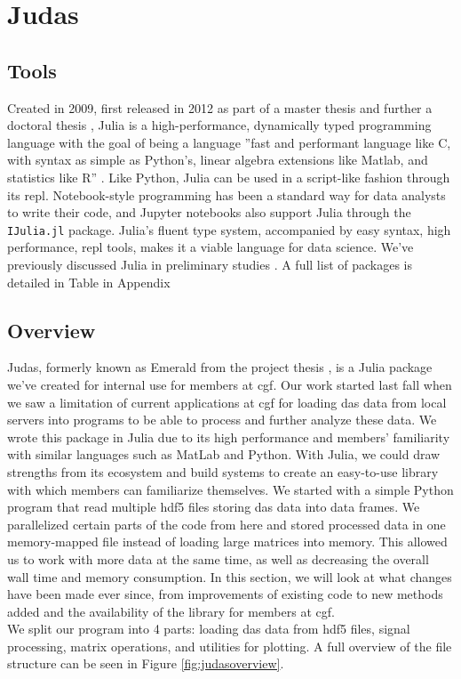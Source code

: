 \section{Judas}
\label{met:Judas}

\subsection{Tools}
\label{met:Julia}

Created in 2009, first released in 2012 as part of a master thesis \cite{juliaMs} and further a doctoral thesis \cite{juliaPHD}, Julia is a high-performance, dynamically typed programming language with the goal of being a language ''fast and performant language like C, with syntax as simple as Python's, linear algebra extensions like Matlab, and statistics like R'' \cite{julia}. Like Python, Julia can be used in a script-like fashion through its \acrfull{repl}. Notebook-style programming has been a standard way for data analysts to write their code, and Jupyter notebooks also support Julia through the \texttt{IJulia.jl} package. Julia's fluent type system, accompanied by easy syntax, high performance, \acrshort{repl} tools, makes it a viable language for data science. We've previously discussed Julia in preliminary studies \cite{projthesis}. A full list of packages is detailed in Table in Appendix 

\subsection{Overview}
\label{met:judasoverview}

Judas, formerly known as Emerald from the project thesis \cite{projthesis}, is a Julia package we've created for internal use for members at \acrshort{cgf}. Our work started last fall when we saw a limitation of current applications at \acrshort{cgf} for loading \acrshort{das} data from local servers into programs to be able to process and further analyze these data. We wrote this package in Julia due to its high performance and members' familiarity with similar languages such as MatLab and Python. With Julia, we could draw strengths from its ecosystem and build systems to create an easy-to-use library with which members can familiarize themselves. We started with a simple Python program that read multiple \acrshort{hdf5} files storing \acrshort{das} data into data frames. We parallelized certain parts of the code from here and stored processed data in one memory-mapped file instead of loading large matrices into memory. This allowed us to work with more data at the same time, as well as decreasing the overall wall time and memory consumption.  
In this section, we will look at what changes have been made ever since, from improvements of existing code to new methods added and the availability of the library for members at \acrshort{cgf}. \\
We split our program into 4 parts: loading \acrshort{das} data from \acrshort{hdf5} files, signal processing, matrix operations, and utilities for plotting. A full overview of the file structure can be seen in Figure \ref{fig:judasoverview}.\\

